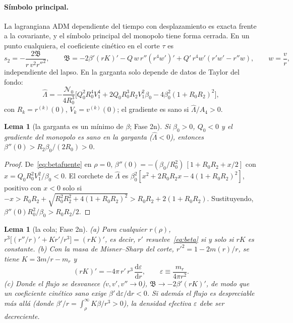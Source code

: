 \documentclass[11pt,a4paper]{article}
\newtheorem{lema}[teorema]{Lema}
\theoremstyle{remark}
\newcommand{\Ncal}{\mathcal N}
\newcommand{\dd}{\mathrm d}
\newcommand{\B}{\mathfrak B}
\begin{document}
\paragraph{Símbolo principal.} La lagrangiana ADM dependiente del tiempo con desplazamiento es exacta frente a la covariante, y el símbolo principal del monopolo tiene forma cerrada. En un punto cualquiera, el coeficiente cinético en el corte $\tau$ es
\begin{equation}
s_2=-\frac{2\B}{r\,v^2r''^2},\qquad \B=-2\beta'(rK)'-Q\,w\,r''(r^4w')'+Q'\,r^4w'(r'w'-r''w),\qquad w=\frac vr ,
\label{eq:B}
\end{equation}
independiente del lapso. En la garganta solo depende de datos de Taylor del fondo:
\begin{equation}
\hat\Lambda=-\frac{\Ncal_0}{4R_0^3}\Big[Q_0^2R_0^4V_1^4+2Q_0R_0^3R_2V_1^2\beta_0-4\beta_0^2(1+R_0R_2)^2\Big],
\end{equation}
con $R_k=r^{(k)}(0)$, $V_k=v^{(k)}(0)$; el gradiente es sano si $\hat\Lambda/A_4>0$.

\begin{lema}[la garganta es un mínimo de $\beta$; Fase 2n]\label{lem:minimo}
Si $\beta_0>0$, $Q_0<0$ y el gradiente del monopolo es sano en la garganta ($\hat\Lambda<0$), entonces $\beta''(0)>R_2\beta_0/(2R_0)>0$.
\end{lema}
\begin{proof}
De~\eqref{eq:betafuente} en $\rho=0$, $\beta''(0)=-(\beta_0/R_0^2)\,[1+R_0R_2+x/2]$ con $x=Q_0R_0^2V_1^2/\beta_0<0$. El corchete de $\hat\Lambda$ es $\beta_0^2[x^2+2R_0R_2x-4(1+R_0R_2)^2]$, positivo con $x<0$ solo si $-x>R_0R_2+\sqrt{R_0^2R_2^2+4(1+R_0R_2)^2}>R_0R_2+2(1+R_0R_2)$. Sustituyendo, $\beta''(0)R_0^2/\beta_0>R_0R_2/2$.
\end{proof}

\begin{lema}[la cola; Fase 2n]\label{lem:cola}
(a) Para cualquier $r(\rho)$, $r^3\big[(r''/r)'+Kr'/r^3\big]=(rK)'$, es decir, $r'$ resuelve~\eqref{eq:beta} si y solo si $rK$ es constante. (b) Con la masa de Misner--Sharp del corte, $r'^2=1-2m(r)/r$, se tiene $K=3m/r-m_r$ y
\begin{equation}
(rK)'=-4\pi\,r'\,r^3\,\frac{\dd\varepsilon}{\dd r},\qquad \varepsilon\equiv\frac{m_r}{4\pi r^2}.
\end{equation}
(c) Donde el flujo se desvanece ($v,v',v''\to0$), $\B\to-2\beta'(rK)'$, de modo que un coeficiente cinético sano exige $\beta'\,\dd\varepsilon/\dd r<0$. Si además el flujo es despreciable más allá (donde $\beta'/r=\int_\rho^\infty K\beta/r^3>0$), la densidad efectiva $\varepsilon$ debe ser decreciente.
\end{lema}
\end{document}
